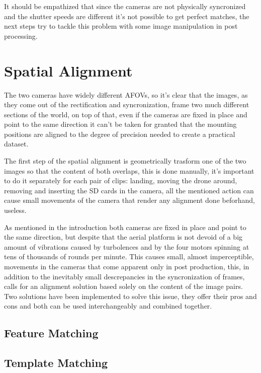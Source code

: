 It should be empathized that since the cameras are not physically syncronized and the shutter speeds are different it's not possible to get perfect matches, the next steps try to tackle this problem with some image manipulation in post processing.

\section{Spatial Alignment}
\label{sec:spatial_align}

The two cameras have widely different AFOVs, so it's clear that the images, as they come out of the rectification and syncronization, frame two much different sections of the world, on top of that, even if the cameras are fixed in place and point to the same direction it can't be taken for granted that the mounting positions are aligned to the degree of precision needed to create a practical dataset.

The first step of the spatial alignment is geometrically trasform one of the two images so that the content of both overlaps, this is done manually, it's important to do it separately for each pair of clips: landing, moving the drone around, removing and inserting the SD cards in the camera, all the mentioned action can cause small movements of the camera that render any alignment done beforhand, useless.



As mentioned in the introduction both cameras are fixed in place and point to the same direction, but despite that the aerial platform is not devoid of a big amount of vibrations caused by turbolences and by the four motors spinning at tens of thousands of rounds per minute.
This causes small, almost imperceptible, movements in the cameras that come apparent only in post production, this, in addition to the inevitably small descrepancies in the syncronization of frames, calls for an alignment solution based solely on the content of the image pairs. Two solutions have been implemented to solve this issue, they offer their pros and cons and both can be used interchangeably and combined together.


\subsection {Feature Matching}
\label{subsec:feature_match}
\subsection {Template Matching}
\label{subsec:template_match}
